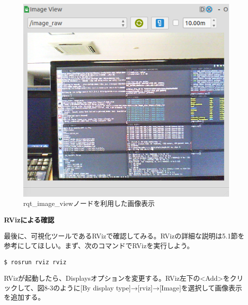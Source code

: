 \begin{figure}[ht]
  \centering
  \includegraphics[width=\columnwidth]{pictures/chapter8/pic_08_02.png}
  \caption{rqt\_image\_viewノードを利用した画像表示}
\end{figure}

\textbf{RVizによる確認}

最後に、可視化ツールであるRVizで確認してみる。RVizの詳細な説明は5.1節を参考にしてほしい。まず、次のコマンドでRVizを実行しよう。

\begin{lstlisting}[language=ROS]
$ rosrun rviz rviz
\end{lstlisting}

RVizが起動したら、Displaysオプションを変更する。RViz左下の<Add>をクリックして、図8-3のように[By display type]→[rviz]→[Image]を選択して画像表示を追加する。

